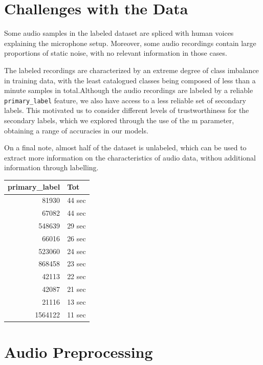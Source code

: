 \documentclass[10pt]{article}
\begin{document}
\section*{Challenges with the Data}

Some audio samples in the labeled dataset are spliced with human voices explaining the microphone setup. Moreover, some audio recordings contain large proportions of static noise, with no relevant information in those cases.

\begin{minipage}{0.7\linewidth}
The labeled recordings are characterized by an extreme degree of class imbalance in training data, with the least catalogued classes being composed of less than a minute samples in total.Although the audio recordings are labeled by a reliable \texttt{primary\_label} feature, we also have access to a less reliable set of secondary labels. This motivated us to consider different levels of trustworthiness for the secondary labels, which we explored through the use of the m parameter, obtaining a range of accuracies in our models.

On a final note, almost half of the dataset is unlabeled, which can be used to extract more information on the characteristics of audio data, withou additional information through labelling.
\end{minipage}
\hfill
\begin{minipage}{0.3\linewidth}
  \centering
  \begin{tabular}{|r|l|}
    \hline
    \textbf{primary\_label} & \textbf{Tot} \\
    \hline
    81930    & 44 sec \\
    67082    & 44 sec \\
    548639   & 29 sec \\
    66016    & 26 sec \\
    523060   & 24 sec \\
    868458   & 23 sec \\
    42113    & 22 sec \\
    42087    & 21 sec \\
    21116    & 13 sec \\
    1564122  & 11 sec \\
    \hline
  \end{tabular}
\end{minipage}

\section*{Audio Preprocessing}
\end{document}
